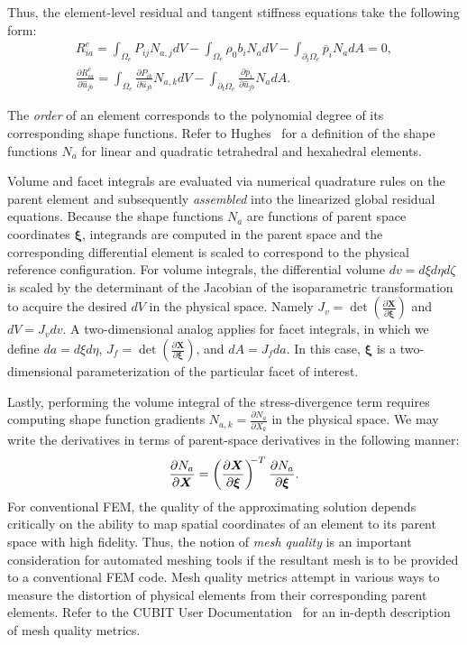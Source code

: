 Thus, the element-level residual and tangent stiffness equations take the following form:
\begin{gather}
R^e_{ia} = \int_{\Omega_e}P_{ij}N_{a,j}dV - \int_{\Omega_e}\rho_0b_iN_adV - \int_{\partial_t\Omega_e} \overline{p}_iN_adA = 0, \label{eqn:elr} \\[0.7em]
\frac{\partial R^e_{ia}}{\partial \hat{u}_{jb}} = \int_{\Omega_e}\frac{\partial P_{ik}}{\partial \hat{u}_{jb}}N_{a,k}dV - \int_{\partial_t\Omega_e}\frac{\partial \overline{p}_i}{\partial \hat{u}_{jb}}N_adA. \label{eqn:elt}
\end{gather}

The \textit{order} of an element corresponds to the polynomial degree of its corresponding shape functions. Refer to Hughes~\cite{hughes_2000} for a definition of the shape functions $N_a$ for linear and quadratic tetrahedral and hexahedral elements. 

Volume and facet integrals are evaluated via numerical quadrature rules on the parent element and subsequently \textit{assembled} into the linearized global residual equations. Because the shape functions $N_a$ are functions of parent space coordinates $\bm{\xi}$, integrands are computed in the parent space and the corresponding differential element is scaled to correspond to the physical reference configuration. For volume integrals, the differential volume $dv = {d\xi}{d\eta}{d\zeta}$ is scaled by the determinant of the Jacobian of the isoparametric transformation to acquire the desired $dV$ in the physical space. Namely $J_v = \det(\frac{\partial{\bm{X}}}{\partial\bm{\xi}})$ and $dV = J_vdv$. A two-dimensional analog applies for facet integrals, in which we define $da = {d\xi}{d\eta}$, $J_f = \det(\frac{\partial{\bm{X}}}{\partial\bm{\xi}})$, and $dA = J_fda$. In this case, $\bm{\xi}$ is a two-dimensional parameterization of the particular facet of interest.

Lastly, performing the volume integral of the stress-divergence term requires computing shape function gradients $N_{a,k} = \frac{\partial N_a}{\partial X_k}$ in the physical space. We may write the derivatives in terms of parent-space derivatives in the following manner:
\begin{equation}
\frac{\partial N_a}{\partial \bm{X}} = \left(\frac{\partial \bm{X}}{\partial \bm{\xi}}\right)^{\hspace{-0.3em}-T} \hspace{0.05em} \frac{\partial N_a}{\partial \bm{\xi}}.
\end{equation}
For conventional FEM, the quality of the approximating solution depends critically on the ability to map spatial coordinates of an element to its parent space with high fidelity. Thus, the notion of \textit{mesh quality} is an important consideration for automated meshing tools if the resultant mesh is to be provided to a conventional FEM code. Mesh quality metrics attempt in various ways to measure the distortion of physical elements from their corresponding parent elements. Refer to the CUBIT User Documentation~\cite{cubit_2018} for an in-depth description of mesh quality metrics.

